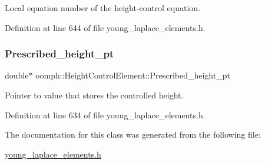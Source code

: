 Local equation number of the height-\/control equation. 



Definition at line 644 of file young\+\_\+laplace\+\_\+elements.\+h.

\mbox{\label{classoomph_1_1HeightControlElement_a84d4b72f7ce6ed722a5deac748ec874b}} 
\subsubsection{\texorpdfstring{Prescribed\+\_\+height\+\_\+pt}{Prescribed\_height\_pt}}
{\footnotesize\ttfamily double$\ast$ oomph\+::\+Height\+Control\+Element\+::\+Prescribed\+\_\+height\+\_\+pt\hspace{0.3cm}{\ttfamily [private]}}



Pointer to value that stores the controlled height. 



Definition at line 634 of file young\+\_\+laplace\+\_\+elements.\+h.



The documentation for this class was generated from the following file\+:\begin{DoxyCompactItemize}
\item 
\hyperlink{young__laplace__elements_8h}{young\+\_\+laplace\+\_\+elements.\+h}\end{DoxyCompactItemize}
